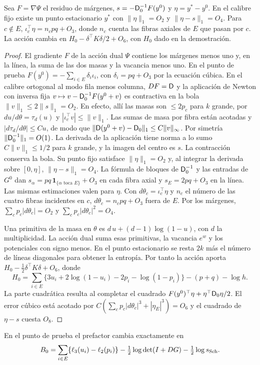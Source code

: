 \begin{lema}\label{lem:linea-desplazamiento}
Sea $F=\nabla\Psi$ el residuo de márgenes, $s=-\mathsf D_0^{-1}F(y^0)$ y $\eta=y^*-y^0$. En el
calibre fijo existe un punto estacionario $y^*$ con $\|\eta\|_1=O_2$ y $\|\eta-s\|_1=O_4$.
Para $c\notin E$, $\iota_c^\top\eta=n_cpq+O_3$, donde $n_c$ cuenta las fibras axiales
de $E$ que pasan por $c$. La acción cambia en $H_0-\delta^\top K\delta/2+O_6$,
con $H_0$ dado en la demostración.
\end{lema}
\begin{proof}
El gradiente $F$ de la acción dual $\Psi$ contiene los márgenes menos uno y, en la línea,
la suma de las dos masas y la vacancia menos uno. En el punto de prueba
$F(y^0)=-\sum_{i\in E}\delta_i\iota_i$, con $\delta_i=pq+O_3$ por la ecuación cúbica.
En el calibre ortogonal al modo fila menos columna, $DF=\mathsf D$ y la aplicación de Newton
con inversa fija $v\mapsto v-\mathsf D_0^{-1}F(y^0+v)$ es contractiva en la bola
$\|v\|_1\le 2\|s\|_1=O_2$. En efecto, allí las masas son $\le 2p_c$ para $k$ grande,
por $du/d\theta=\tau_d(u)$ y $|\iota_c^\top v|\le\|v\|_1$. Las sumas de masa por
fibra están acotadas y $|d\tau_d/d\theta|\le C u$, de modo que
$\|\mathsf D(y^0+v)-\mathsf D_0\|_1\le C\|v\|_\infty$. Por simetría $\|\mathsf D_0^{-1}\|_1=O(1)$.
La derivada de la aplicación tiene norma a lo sumo $C\|v\|_1\le1/2$ para $k$ grande,
y la imagen del centro es $s$. La contracción conserva la bola. Su punto fijo satisface
$\|\eta\|_1=O_2$ y, al integrar la derivada sobre $[0,\eta]$, $\|\eta-s\|_1=O_4$.
La fórmula de bloques de $\mathsf D_0^{-1}$ y las entradas de $G^0$ dan
$s_\alpha=pq\,\symbf{1}_{\{\alpha\text{ toca }E\}}+O_3$ en cada fibra axial
y $s_E=2pq+O_3$ en la línea. Las mismas estimaciones valen para $\eta$.
Con $d\theta_c=\iota_c^\top\eta$ y $n_c$ el número de las cuatro fibras incidentes en $c$,
$d\theta_c=n_cpq+O_3$ fuera de $E$. Por los márgenes,
$\sum_c p_c|d\theta_c|=O_2$ y $\sum_c p_c|d\theta_c|^2=O_4$.

Una primitiva de la masa en $\theta$ es $d\,u+(d-1)\log(1-u)$, con $d$ la multiplicidad.
La acción dual suma esas primitivas, la vacancia $e^{w}$ y los potenciales con signo menos.
En el punto estacionario se resta $2k$ más el número de líneas diagonales para obtener
la entropía. Por tanto la acción aporta $H_0-\tfrac12\delta^\top K\delta+O_6$, donde
\[
 H_0=\sum_{i\in E}\{3u_i+2\log(1-u_i)-2p_i-\log(1-p_i)\}-(p+q)-\log h .
\]
La parte cuadrática resulta al completar el cuadrado
$F(y^0)^\top\eta+\eta^\top \mathsf D_0\eta/2$. El error cúbico está acotado por
$C(\sum_c p_c|d\theta_c|^3+|\eta_E|^3)=O_6$ y el cuadrado de $\eta-s$ cuesta $O_8$.
\end{proof}
En el punto de prueba el prefactor cambia exactamente en
\[
 B_0=\sum_{i\in E}\{\ell_3(u_i)-\ell_2(p_i)\}
       -\tfrac12\log\det(I+DG)-\tfrac12\log s_{\mathrm{Sch}} .
\]


